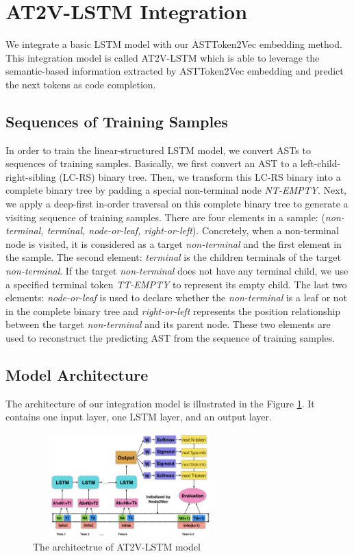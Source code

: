 \documentclass[E]{compsoft}
\begin{document}
\section{AT2V-LSTM Integration}
\label{section:n2v-lstm-integration}
We integrate a basic LSTM model with our ASTToken2Vec embedding method. This integration model is called AT2V-LSTM which is able to leverage the semantic-based information extracted by ASTToken2Vec embedding and predict the next tokens as code completion.


\subsection{Sequences of Training Samples}
In order to train the linear-structured LSTM model, we convert ASTs to sequences of training samples.
Basically, we first convert an AST to a left-child-right-sibling (LC-RS) binary tree. 
Then, we transform this LC-RS binary into a complete binary tree by padding a special non-terminal node \textit{NT-EMPTY}.
Next, we apply a deep-first in-order traversal on this complete binary tree to generate a visiting sequence of training samples. 
There are four elements in a sample: (\textit{non-terminal, terminal, node-or-leaf, right-or-left}).
Concretely, when a non-terminal node is visited, it is considered as a target \textit{non-terminal} and the first element in the sample.
The second element: \textit{terminal} is the children terminals of the target \textit{non-terminal}.
If the target \textit{non-terminal} does not have any terminal child, we use a specified terminal token \textit{TT-EMPTY} to represent its empty child.
The last two elements: \textit{node-or-leaf} is used to declare whether the \textit{non-terminal} is a leaf or not in the complete binary tree and \textit{right-or-left} represents the position relationship between the target \textit{non-terminal} and its parent node. 
These two elements are used to reconstruct the predicting AST from the sequence of training samples.



\subsection{Model Architecture}
The architecture of our integration model is illustrated in the Figure \ref{fig:nti2p_model_architecture}. 
It contains one input layer, one LSTM layer, and an output layer. 


\begin{figure}[!ht]
\centering
\includegraphics[height=4cm, width=7.5cm]{pictures/lstm_structure.png}
\caption{The architectrue of AT2V-LSTM model}
\label{fig:nti2p_model_architecture}
\end{figure}
\end{document}
